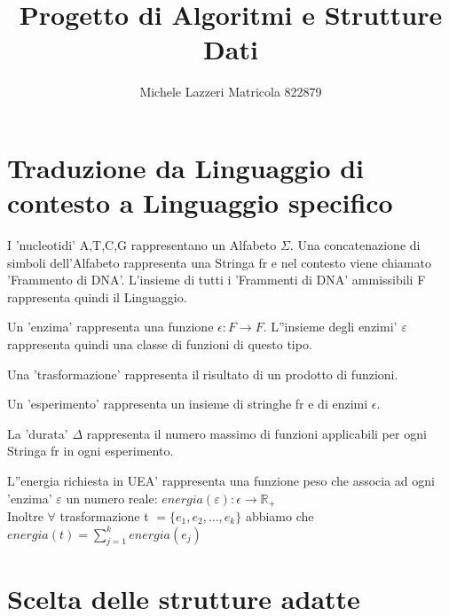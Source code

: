 \documentclass[a4paper,10pt]{article}
\begin{document}
\author{Michele Lazzeri Matricola 822879}
\title{Progetto di Algoritmi e Strutture Dati}
\date{}
\maketitle
\section{Traduzione da Linguaggio di contesto a Linguaggio specifico}
I 'nucleotidi' {A,T,C,G} rappresentano un Alfabeto $\Sigma$. Una concatenazione di simboli dell'Alfabeto rappresenta una Stringa fr e nel contesto viene chiamato 'Frammento di DNA'. L'insieme di tutti i 'Frammenti di DNA' ammissibili {\large F} rappresenta quindi il Linguaggio.

Un 'enzima' rappresenta una funzione $\epsilon\colon F\to F$. L''insieme degli enzimi' $\varepsilon$ rappresenta quindi una classe di funzioni di questo tipo.

Una 'trasformazione' rappresenta il risultato di un prodotto di funzioni.

Un 'esperimento' rappresenta un insieme di stringhe fr e di enzimi $\epsilon$.

La 'durata' $\Delta$ rappresenta il numero massimo di funzioni applicabili per ogni Stringa fr in ogni esperimento.

L''energia richiesta in UEA' rappresenta una funzione peso che associa ad ogni 'enzima' $\varepsilon$ un numero reale: $energia(\varepsilon)\colon\epsilon\to\mathbb{R_+}$
\\Inoltre $\forall$ trasformazione t $=\{e_1,e_2,\dots,e_k\}$ abbiamo che $energia(t)=\sum_{j=1}^k energia(e_j)$

\section{Scelta delle strutture adatte}
\end{document}
